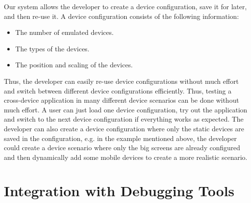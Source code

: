Our system allows the developer to create a device configuration, save it for later, and then re-use it. A device configuration consists of the following information:
\begin{itemize}
	\item The number of emulated devices.
	\item The types of the devices.
	\item The position and scaling of the devices.
\end{itemize}
Thus, the developer can easily re-use device configurations without much effort and switch between different device configurations efficiently. Thus, testing a cross-device application in many different device scenarios can be done without much effort. A user can just load one device configuration, try out the application and switch to the next device configuration if everything works as expected. The developer can also create a device configuration where only the static devices are saved in the configuration, e.g. in the example mentioned above, the developer could create a device scenario where only the big screens are already configured and then dynamically add some mobile devices to create a more realistic scenario.

\section{Integration with Debugging Tools}

